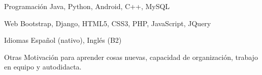

\begin{cvskills}

  \cvskill
    {Programación} %
    {Java, Python, Android, C++, MySQL} %

  \cvskill
    {Web} %
    {Bootstrap, Django, HTML5, CSS3, PHP, JavaScript, JQuery} %

  \cvskill
    {Idiomas} %
    {Español (nativo), Inglés (B2)} %

  \cvskill
    {Otras} %
    {Motivación para aprender cosas nuevas, capacidad de organización, trabajo en equipo y autodidacta.} %

\end{cvskills}
